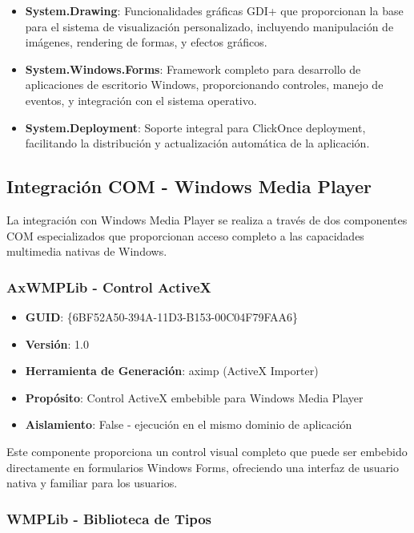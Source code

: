 \documentclass[a4paper]{article}
\begin{document}
\begin{itemize}
\item \textbf{System.Drawing}: Funcionalidades gráficas GDI+ que proporcionan la base para el sistema de visualización personalizado, incluyendo manipulación de imágenes, rendering de formas, y efectos gráficos.

\item \textbf{System.Windows.Forms}: Framework completo para desarrollo de aplicaciones de escritorio Windows, proporcionando controles, manejo de eventos, y integración con el sistema operativo.

\item \textbf{System.Deployment}: Soporte integral para ClickOnce deployment, facilitando la distribución y actualización automática de la aplicación.
\end{itemize}

\subsection{Integración COM - Windows Media Player}

La integración con Windows Media Player se realiza a través de dos componentes COM especializados que proporcionan acceso completo a las capacidades multimedia nativas de Windows.

\subsubsection{AxWMPLib - Control ActiveX}

\begin{itemize}
\item \textbf{GUID}: \{6BF52A50-394A-11D3-B153-00C04F79FAA6\}
\item \textbf{Versión}: 1.0
\item \textbf{Herramienta de Generación}: aximp (ActiveX Importer)
\item \textbf{Propósito}: Control ActiveX embebible para Windows Media Player
\item \textbf{Aislamiento}: False - ejecución en el mismo dominio de aplicación
\end{itemize}

Este componente proporciona un control visual completo que puede ser embebido directamente en formularios Windows Forms, ofreciendo una interfaz de usuario nativa y familiar para los usuarios.

\subsubsection{WMPLib - Biblioteca de Tipos}
\end{document}
